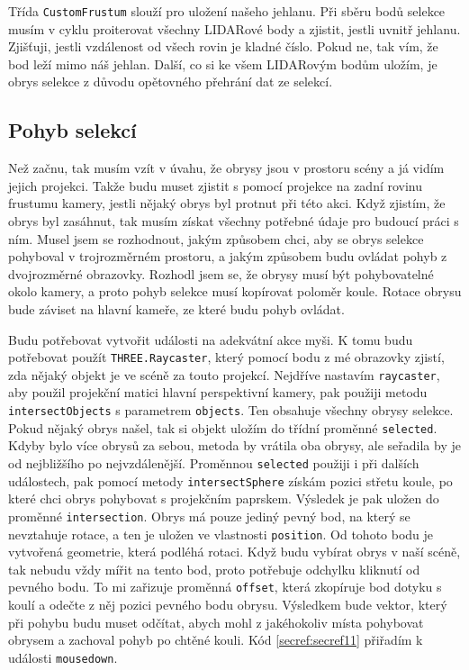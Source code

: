 \documentclass[czech,bachelor,dept420,male,cpdeclaration]{diploma}
\begin{document}
 

Třída \texttt{CustomFrustum} slouží pro uložení našeho jehlanu. Při sběru bodů selekce musím v cyklu proiterovat všechny LIDARové body a zjistit, jestli uvnitř jehlanu. Zjišťuji, jestli vzdálenost od všech rovin je kladné číslo. Pokud ne, tak vím, že bod leží mimo náš jehlan. Další, co si ke všem LIDARovým bodům uložím, je obrys selekce z důvodu opětovného přehrání dat ze selekcí.



\subsection{Pohyb selekcí} 
Než začnu, tak musím vzít v úvahu, že obrysy jsou v prostoru scény a já vidím jejich projekci. Takže budu muset zjistit s pomocí projekce na zadní rovinu frustumu kamery, jestli nějaký obrys byl protnut při této akci. Když zjistím, že obrys byl zasáhnut, tak musím získat všechny potřebné údaje pro budoucí práci s ním. Musel jsem se rozhodnout, jakým způsobem chci, aby se obrys selekce pohyboval v trojrozměrném prostoru, a jakým způsobem budu ovládat pohyb z dvojrozměrné obrazovky. Rozhodl jsem se, že obrysy musí být pohybovatelné okolo kamery, a proto pohyb selekce musí kopírovat poloměr koule. Rotace obrysu bude záviset na hlavní kameře, ze které budu pohyb ovládat.

\medskip
\begin{minipage}{\linewidth}
 
\end{minipage}

Budu potřebovat vytvořit události na adekvátní akce myši. K tomu budu potřebovat použít \texttt{THREE.Raycaster}, který pomocí bodu z mé obrazovky zjistí, zda nějaký objekt je ve scéně za touto projekcí. Nejdříve nastavím \texttt{raycaster}, aby použil projekční matici hlavní perspektivní kamery, pak použiji metodu \texttt{intersectObjects} s parametrem \texttt{objects}. Ten obsahuje všechny obrysy selekce. Pokud nějaký obrys našel, tak si objekt uložím do třídní proměnné \texttt{selected}. Kdyby bylo více obrysů za sebou, metoda by vrátila oba obrysy, ale seřadila by je od nejbližšího po nejvzdálenější. Proměnnou \texttt{selected} použiji i při dalších událostech, pak pomocí metody \texttt{intersectSphere} získám pozici střetu koule, po které chci obrys pohybovat s projekčním paprskem. Výsledek je pak uložen do proměnné \texttt{intersection}. Obrys má pouze jediný pevný bod, na který se nevztahuje rotace, a ten je uložen ve vlastnosti \texttt{position}. Od tohoto bodu je vytvořená geometrie, která podléhá rotaci. Když budu vybírat obrys v naší scéně, tak nebudu vždy mířit na tento bod, proto potřebuje odchylku kliknutí od pevného bodu. To mi zařizuje proměnná \texttt{offset}, která zkopíruje bod dotyku s koulí a odečte z něj pozici pevného bodu obrysu. Výsledkem bude vektor, který při pohybu budu muset odčítat, abych mohl z jakéhokoliv místa pohybovat obrysem a zachoval pohyb po chtěné kouli. Kód \ref{secref:secref11} přiřadím k události \texttt{mousedown}.
\end{document}
